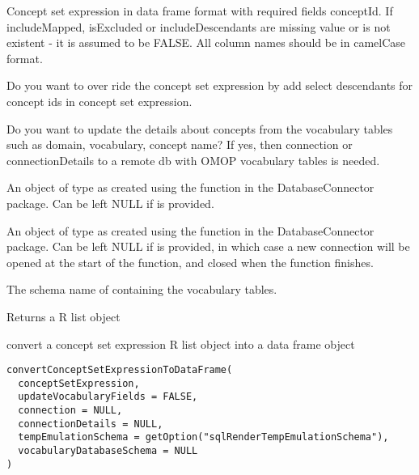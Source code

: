 \documentclass[a4paper]{book}
\begin{document}
%
\begin{Arguments}
\begin{ldescription}
\item[\code{conceptSetExpressionDataFrame}] Concept set expression in data frame format with required fields
conceptId. If includeMapped, isExcluded or includeDescendants
are missing value or is not existent - it is assumed to be FALSE.
All column names should be in camelCase format.

\item[\code{selectAllDescendants}] Do you want to over ride the concept set
expression by add select descendants for concept ids
in concept set expression.

\item[\code{updateVocabularyFields}] Do you want to update the details about concepts from the vocabulary tables such as domain, 
vocabulary, concept name? If yes, then connection or connectionDetails to a 
remote db with OMOP vocabulary tables is needed.

\item[\code{connectionDetails}] An object of type  as created using the
 function in the
DatabaseConnector package. Can be left NULL if  is
provided.

\item[\code{connection}] An object of type  as created using the
 function in the
DatabaseConnector package. Can be left NULL if 
is provided, in which case a new connection will be opened at the start
of the function, and closed when the function finishes.

\item[\code{vocabularyDatabaseSchema}] The schema name of containing the vocabulary tables.
\end{ldescription}
\end{Arguments}
%
\begin{Value}
Returns a R list object
\end{Value}
%
\begin{Description}\relax
convert a concept set expression R list object into a data frame object
\end{Description}
%
\begin{Usage}
\begin{verbatim}
convertConceptSetExpressionToDataFrame(
  conceptSetExpression,
  updateVocabularyFields = FALSE,
  connection = NULL,
  connectionDetails = NULL,
  tempEmulationSchema = getOption("sqlRenderTempEmulationSchema"),
  vocabularyDatabaseSchema = NULL
)
\end{verbatim}
\end{Usage}
\end{document}
